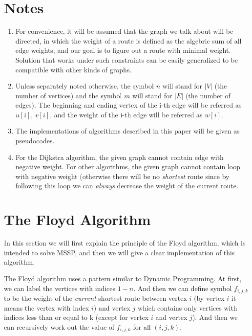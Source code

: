 \documentclass[a4paper,11pt,twocolumn]{article}
\begin{document}
\section{Notes}

\begin{enumerate}

\item{For convenience, it will be assumed that the graph we talk about will be directed, in which the weight of a route is defined as the algebric sum of all edge weights, and our goal is to figure out a route with minimal weight. Solution that works under such constraints can be easily generalized to be compatible with other kinds of graphs. }

\item{Unless separately noted otherwise, the symbol $n$ will stand for $|V|$ (the number of vertices) and the symbol $m$ will stand for $|E|$ (the number of edges). The beginning and ending vertex of the i-th edge will be referred as $u[i]$, $v[i]$, and the weight of the i-th edge will be referred as $w[i]$. }

\item{The implementations of algorithms described in this paper will be given as pseudocodes. }

\item{For the Dijkstra algorithm, the given graph cannot contain edge with negative weight. For other algorithms, the given graph cannot contain loop with negative weight (otherwise there will be no \emph{shortest} route since by following this loop we can \emph{always} decrease the weight of the current route. }

\end{enumerate}

\section{The Floyd Algorithm}

In this section we will first explain the principle of the Floyd algorithm, which is intended to solve MSSP, and then we will give a clear implementation of this algorithm.

The Floyd algorithm uses a pattern similar to Dynamic Programming. At first, we can label the vertices with indices $1-n$. And then we can define symbol $f_{i,j,k}$ to be the weight of the \emph{current} shortest route between vertex $i$ (by vertex $i$ it means the vertex with index $i$) and vertex $j$ which contains only vertices with indices less than or equal to k (except for vertex $i$ and vertex $j$). And then we can recursively work out the value of $f_{i,j,k}$ for all $(i,j,k)$.
\end{document}
